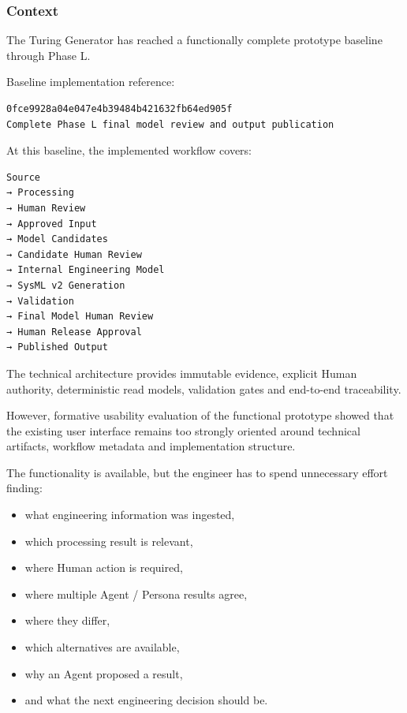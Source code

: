 \hypertarget{context-9}{%
\subsubsection{Context}\label{context-9}}

The Turing Generator has reached a functionally complete prototype baseline through Phase L.

Baseline implementation reference:

\begin{verbatim}
0fce9928a04e047e4b39484b421632fb64ed905f
Complete Phase L final model review and output publication
\end{verbatim}

At this baseline, the implemented workflow covers:

\begin{verbatim}
Source
→ Processing
→ Human Review
→ Approved Input
→ Model Candidates
→ Candidate Human Review
→ Internal Engineering Model
→ SysML v2 Generation
→ Validation
→ Final Model Human Review
→ Human Release Approval
→ Published Output
\end{verbatim}

The technical architecture provides immutable evidence, explicit Human authority, deterministic read models, validation gates and end-to-end traceability.

However, formative usability evaluation of the functional prototype showed that the existing user interface remains too strongly oriented around technical artifacts, workflow metadata and implementation structure.

The functionality is available, but the engineer has to spend unnecessary effort finding:

\begin{itemize}
\tightlist
\item
  what engineering information was ingested,
\item
  which processing result is relevant,
\item
  where Human action is required,
\item
  where multiple Agent / Persona results agree,
\item
  where they differ,
\item
  which alternatives are available,
\item
  why an Agent proposed a result,
\item
  and what the next engineering decision should be.
\end{itemize}

